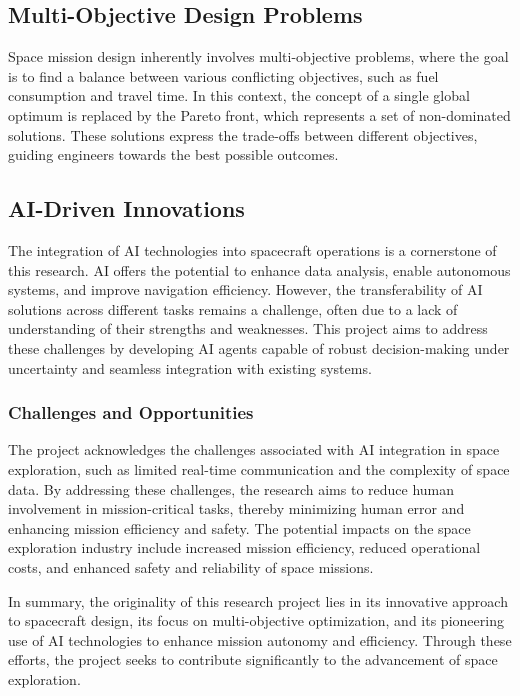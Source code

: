 \documentclass[a4paper, 11pt]{article}
\begin{document}
\subsection{Multi-Objective Design Problems}

Space mission design inherently involves multi-objective problems, where the goal is to find a balance between various conflicting objectives, such as fuel consumption and travel time. In this context, the concept of a single global optimum is replaced by the Pareto front, which represents a set of non-dominated solutions. These solutions express the trade-offs between different objectives, guiding engineers towards the best possible outcomes.

\subsection{AI-Driven Innovations}

The integration of AI technologies into spacecraft operations is a cornerstone of this research. AI offers the potential to enhance data analysis, enable autonomous systems, and improve navigation efficiency. However, the transferability of AI solutions across different tasks remains a challenge, often due to a lack of understanding of their strengths and weaknesses. This project aims to address these challenges by developing AI agents capable of robust decision-making under uncertainty and seamless integration with existing systems.

\subsubsection{Challenges and Opportunities}

The project acknowledges the challenges associated with AI integration in space exploration, such as limited real-time communication and the complexity of space data. By addressing these challenges, the research aims to reduce human involvement in mission-critical tasks, thereby minimizing human error and enhancing mission efficiency and safety. The potential impacts on the space exploration industry include increased mission efficiency, reduced operational costs, and enhanced safety and reliability of space missions.

In summary, the originality of this research project lies in its innovative approach to spacecraft design, its focus on multi-objective optimization, and its pioneering use of AI technologies to enhance mission autonomy and efficiency. Through these efforts, the project seeks to contribute significantly to the advancement of space exploration.
\end{document}
